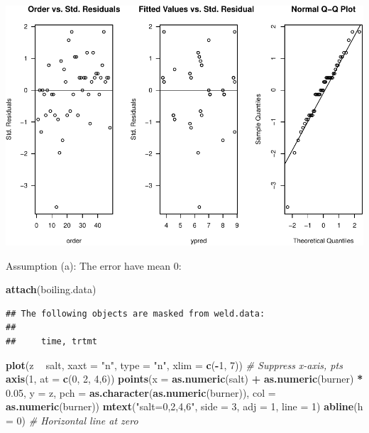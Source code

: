 \documentclass[12pt,]{article}
\newenvironment{Shaded}{\begin{snugshade}}{\end{snugshade}}
\newcommand{\KeywordTok}[1]{\textcolor[rgb]{0.13,0.29,0.53}{\textbf{#1}}}
\newcommand{\DataTypeTok}[1]{\textcolor[rgb]{0.13,0.29,0.53}{#1}}
\newcommand{\DecValTok}[1]{\textcolor[rgb]{0.00,0.00,0.81}{#1}}
\newcommand{\FloatTok}[1]{\textcolor[rgb]{0.00,0.00,0.81}{#1}}
\newcommand{\StringTok}[1]{\textcolor[rgb]{0.31,0.60,0.02}{#1}}
\newcommand{\CommentTok}[1]{\textcolor[rgb]{0.56,0.35,0.01}{\textit{#1}}}
\newcommand{\OperatorTok}[1]{\textcolor[rgb]{0.81,0.36,0.00}{\textbf{#1}}}
\newcommand{\NormalTok}[1]{#1}
\begin{document}
\includegraphics{Markdown_HW_6_files/figure-latex/unnamed-chunk-10-1.pdf}

Assumption (a): The error have mean 0:

\begin{Shaded}
\begin{Highlighting}[]
\KeywordTok{attach}\NormalTok{(boiling.data)}
\end{Highlighting}
\end{Shaded}

\begin{verbatim}
## The following objects are masked from weld.data:
## 
##     time, trtmt
\end{verbatim}

\begin{Shaded}
\begin{Highlighting}[]
\KeywordTok{plot}\NormalTok{(z }\OperatorTok{~}\StringTok{ }\NormalTok{salt, }\DataTypeTok{xaxt =} \StringTok{"n"}\NormalTok{, }\DataTypeTok{type =} \StringTok{"n"}\NormalTok{, }\DataTypeTok{xlim =} \KeywordTok{c}\NormalTok{(}\OperatorTok{-}\DecValTok{1}\NormalTok{, }\DecValTok{7}\NormalTok{)) }\CommentTok{# Suppress x-axis, pts}
\KeywordTok{axis}\NormalTok{(}\DecValTok{1}\NormalTok{, }\DataTypeTok{at =} \KeywordTok{c}\NormalTok{(}\DecValTok{0}\NormalTok{, }\DecValTok{2}\NormalTok{, }\DecValTok{4}\NormalTok{,}\DecValTok{6}\NormalTok{))}
\KeywordTok{points}\NormalTok{(}\DataTypeTok{x =} \KeywordTok{as.numeric}\NormalTok{(salt) }\OperatorTok{+}\StringTok{ }\KeywordTok{as.numeric}\NormalTok{(burner) }\OperatorTok{*}\StringTok{ }\FloatTok{0.05}\NormalTok{, }\DataTypeTok{y =}\NormalTok{ z,}
\DataTypeTok{pch =} \KeywordTok{as.character}\NormalTok{(}\KeywordTok{as.numeric}\NormalTok{(burner)), }\DataTypeTok{col =} \KeywordTok{as.numeric}\NormalTok{(burner)) }
\KeywordTok{mtext}\NormalTok{(}\StringTok{"salt=0,2,4,6"}\NormalTok{, }\DataTypeTok{side =} \DecValTok{3}\NormalTok{, }\DataTypeTok{adj =} \DecValTok{1}\NormalTok{, }\DataTypeTok{line =} \DecValTok{1}\NormalTok{)}
\KeywordTok{abline}\NormalTok{(}\DataTypeTok{h =} \DecValTok{0}\NormalTok{) }\CommentTok{# Horizontal line at zero}
\end{Highlighting}
\end{Shaded}
\end{document}
